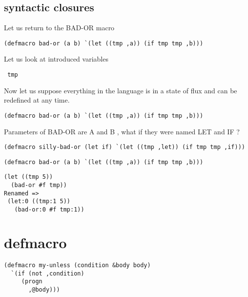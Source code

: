 \documentclass{article}
\begin{document}
\newpage

\subsection{syntactic closures}

Let us return to the BAD-OR macro

\begin{verbatim}
(defmacro bad-or (a b) `(let ((tmp ,a)) (if tmp tmp ,b)))
\end{verbatim}

Let us look at introduced variables \begin{verbatim} tmp  \end{verbatim}

Now let us suppose everything in the language is in a state of flux and can be redefined at any time.

\begin{verbatim}
(defmacro bad-or (a b) `(let ((tmp ,a)) (if tmp tmp ,b)))
\end{verbatim}

Parameters of BAD-OR are A and B , what if they were named LET and IF ?

\begin{verbatim}
(defmacro silly-bad-or (let if) `(let ((tmp ,let)) (if tmp tmp ,if)))
\end{verbatim}




\begin{verbatim}
(defmacro bad-or (a b) `(let ((tmp ,a)) (if tmp tmp ,b)))
\end{verbatim}


\begin{verbatim}
(let ((tmp 5)) 
  (bad-or #f tmp))
Renamed =>
 (let:0 ((tmp:1 5))
   (bad-or:0 #f tmp:1))
\end{verbatim}









\newpage

\section{defmacro}

\begin{verbatim}
(defmacro my-unless (condition &body body)
  `(if (not ,condition)
     (progn
       ,@body)))
\end{verbatim}
\end{document}
